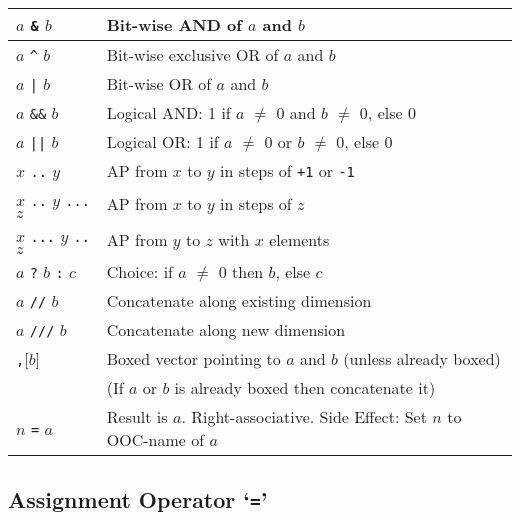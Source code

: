 \begin{tabular}{|l|l|}
    \hline
        $a$
        \texttt{\&}
        $b$
       & 
      Bit-wise AND of 
      $a$ and 
      $b$
    \\
    \hline
        $a$
        \texttt{\^}
        $b$
       & 
      Bit-wise exclusive OR of 
      $a$ and 
      $b$
    \\
    \hline
        $a$
        \texttt{|}
        $b$
       & 
      Bit-wise OR of 
      $a$ and 
      $b$
    \\
    \hline
        $a$
        \texttt{\&\&}
        $b$
       & 
      Logical AND: 1 if 
      $a$ $\neq$ 0 and 
      $b$ $\neq$ 0, else 0
    \\
    \hline
        $a$
        \texttt{||}
        $b$
       & 
      Logical OR: 1 if 
      $a$ $\neq$ 0 or 
      $b$ $\neq$ 0, else 0
    \\
    \hline
        $x$
        \texttt{..}
        $y$
       & 
      AP from 
      $x$ to 
      $y$ in steps of 
      \texttt{+1} or 
      \texttt{-1}
    \\
        $x$
        \texttt{..}
        $y$
        \texttt{...}
        $z$
       & 
      AP from 
      $x$ to 
      $y$ in steps of 
      $z$
    \\
        $x$
        \texttt{...}
        $y$
        \texttt{..}
        $z$
       & 
      AP from 
      $y$ to 
      $z$ with 
      $x$ elements
    \\
    \hline
        $a$
        \texttt{?}
        $b$
        \texttt{:}
        $c$
       & 
      Choice: if 
      $a$ $\neq$ 0 then 
      $b$, else 
      $c$
    \\
    \hline
        $a$
        \texttt{//}
        $b$
       & 
      Concatenate along existing dimension
    \\
        $a$
        \texttt{///}
        $b$
       & 
      Concatenate along new dimension
    \\
    \hline
      [$a$]\texttt{,}[$b$]
	& 
      Boxed vector pointing to $a$ and $b$ (unless already boxed)
    \\
	& 
      (If $a$ or $b$ is already boxed then concatenate it)
    \\
    \hline
        $n$ \texttt{=} $a$
       & 
      Result is $a$. Right-associative. Side Effect: Set $n$ to OOC-name of $a$
    \\
    \hline
\end{tabular}

  \subsection{
    \label{Assignment}Assignment Operator `\texttt{=}'
  }

